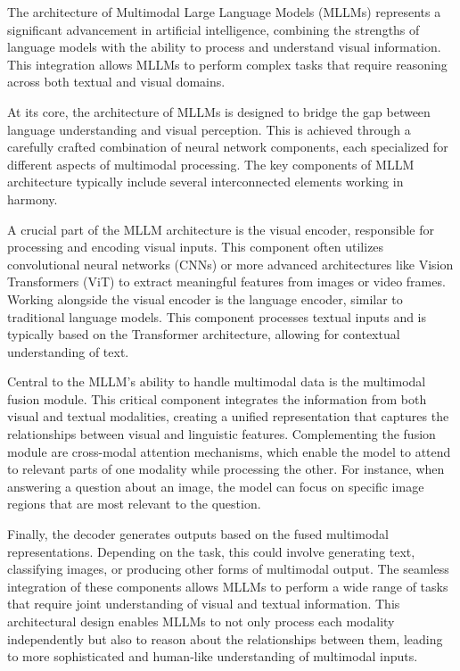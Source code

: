 
The architecture of Multimodal Large Language Models (MLLMs) represents a significant advancement in artificial intelligence, combining the strengths of language models with the ability to process and understand visual information. This integration allows MLLMs to perform complex tasks that require reasoning across both textual and visual domains.

At its core, the architecture of MLLMs is designed to bridge the gap between language understanding and visual perception. This is achieved through a carefully crafted combination of neural network components, each specialized for different aspects of multimodal processing. The key components of MLLM architecture typically include several interconnected elements working in harmony.

A crucial part of the MLLM architecture is the visual encoder, responsible for processing and encoding visual inputs. This component often utilizes convolutional neural networks (CNNs) or more advanced architectures like Vision Transformers (ViT) to extract meaningful features from images or video frames. Working alongside the visual encoder is the language encoder, similar to traditional language models. This component processes textual inputs and is typically based on the Transformer architecture, allowing for contextual understanding of text.

Central to the MLLM's ability to handle multimodal data is the multimodal fusion module. This critical component integrates the information from both visual and textual modalities, creating a unified representation that captures the relationships between visual and linguistic features. Complementing the fusion module are cross-modal attention mechanisms, which enable the model to attend to relevant parts of one modality while processing the other. For instance, when answering a question about an image, the model can focus on specific image regions that are most relevant to the question.

Finally, the decoder generates outputs based on the fused multimodal representations. Depending on the task, this could involve generating text, classifying images, or producing other forms of multimodal output. The seamless integration of these components allows MLLMs to perform a wide range of tasks that require joint understanding of visual and textual information. This architectural design enables MLLMs to not only process each modality independently but also to reason about the relationships between them, leading to more sophisticated and human-like understanding of multimodal inputs.

